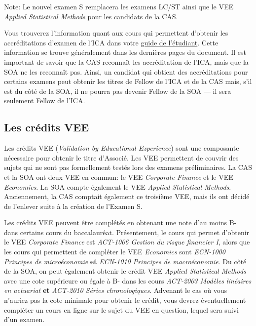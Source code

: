 Note: Le nouvel examen S remplacera les examens LC/ST ainsi que le VEE \emph{Applied Statistical Methods} pour les candidats de la CAS.\vspace{\baselineskip}

Vous trouverez l'information quant aux cours qui permettent d'obtenir les accréditations d'examen de l'ICA dans votre \href{https://www.act.ulaval.ca/programmes-et-cours/premier-cycle/guide-de-letudiant/}{guide de l'étudiant}. Cette information se trouve généralement dans les dernières pages du document. Il est important de savoir que la CAS reconnaît les accréditation de l'ICA, mais que la SOA ne les reconnaît pas. Ainsi, un candidat qui obtient des accréditations pour certains examens peut obtenir les titres de Fellow de l'ICA et de la CAS mais, s'il est du côté de la SOA, il ne pourra pas devenir Fellow de la SOA --- il sera seulement Fellow de l'ICA.

\subsection*{Les crédits VEE}
\label{subsec:vee}
Les crédits VEE (\emph{Validation by Educational Experience}) sont une composante nécessaire pour obtenir le titre d'Associé. Les VEE permettent de couvrir des sujets qui ne sont pas formellement testés lors des examens préliminaires. La CAS et la SOA ont deux VEE en commun: le VEE \emph{Corporate Finance} et le VEE \emph{Economics}. La SOA compte également le VEE \emph{Applied Statistical Methods}. Anciennement, la CAS comptait également ce troisième VEE, mais ils ont décidé de l'enlever suite à la création de l'Examen S.\vspace{\baselineskip}

Les crédits VEE peuvent être complétés en obtenant une note d'au moins B- dans certains cours du baccalauréat. Présentement, le cours qui permet d'obtenir le VEE \emph{Corporate Finance} est \textit{ACT-1006 Gestion du risque financier I}, alors que les cours qui permettent de compléter le VEE \emph{Economics} sont \textit{ECN-1000 Principes de microéconomie} \textbf{et} \textit{ECN-1010 Principes de macroéconomie}. Du côté de la SOA, on peut également obtenir le crédit VEE \emph{Applied Statistical Methods} avec une cote supérieure ou égale à B- dans les cours \textit{ACT-2003 Modèles linéaires en actuariat} \textbf{et} \textit{ACT-2010 Séries chronologiques}. Advenant le cas où vous n'auriez pas la cote minimale pour obtenir le crédit, vous devrez éventuellement compléter un cours en ligne sur le sujet du VEE en question, lequel sera suivi d'un examen.

